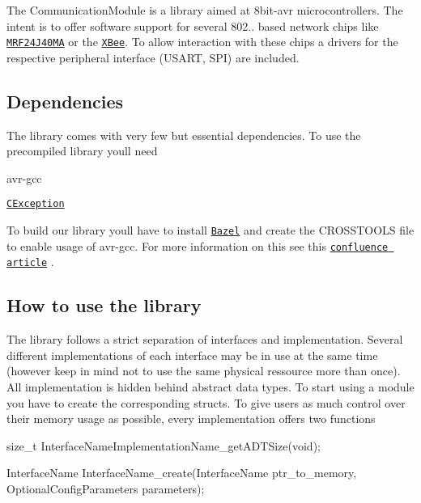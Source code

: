 The Communication\+Module is a library aimed at 8bit-\/avr microcontrollers. The intent is to offer software support for several 802.. based network chips like \href{https://www.microchip.com/wwwproducts/en/MRF24J40MA}{\tt M\+R\+F24\+J40\+MA} or the \href{https://www.digi.com/products/xbee-rf-solutions/2-4-ghz-modules/xbee-802-15-4#productsupport}{\tt X\+Bee}. To allow interaction with these chips a drivers for the respective peripheral interface (U\+S\+A\+RT, S\+PI) are included.

\subsection*{Dependencies}

The library comes with very few but essential dependencies. To use the precompiled library you\textquotesingle{}ll need
\begin{DoxyEnumerate}
\item avr-\/gcc
\item \href{https://github.com/ThrowTheSwitch/CException}{\tt C\+Exception}
\end{DoxyEnumerate}

To build our library you\textquotesingle{}ll have to install \href{https://bazel.build}{\tt Bazel} and create the C\+R\+O\+S\+S\+T\+O\+O\+LS file to enable usage of avr-\/gcc. For more information on this see this \href{http://confluence.es.uni-due.de:8090/pages/viewpage.action?pageId=23953429}{\tt confluence article} .

\subsection*{How to use the library}

The library follows a strict separation of interfaces and implementation. Several different implementations of each interface may be in use at the same time (however keep in mind not to use the same physical ressource more than once). All implementation is hidden behind abstract data types. To start using a module you have to create the corresponding structs. To give users as much control over their memory usage as possible, every implementation offers two functions


\begin{DoxyEnumerate}
\item size\+\_\+t Interface\+Name\+Implementation\+Name\+\_\+get\+A\+D\+T\+Size(void);
\item Interface\+Name Interface\+Name\+\_\+create(\+Interface\+Name ptr\+\_\+to\+\_\+memory, Optional\+Config\+Parameters parameters);
\end{DoxyEnumerate}

